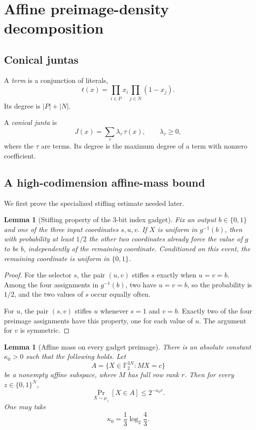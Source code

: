 \documentclass[11pt]{article}
\newtheorem{lemma}[theorem]{Lemma}
\theoremstyle{definition}
\newcommand{\F}{\mathbb F}
\newcommand{\bits}{\{0,1\}}
\newcommand{\Prb}{\mathop{\Pr}}
\begin{document}
\section{Affine preimage-density decomposition}\label{sec:indexing-lift}

\subsection{Conical juntas}

A \emph{term} is a conjunction of literals,
\[
 t(x)=\prod_{i\in P}x_i\prod_{j\in N}(1-x_j).
\]
Its degree is $|P|+|N|$.

A \emph{conical junta} is
\[
  J(x)=\sum_\tau \lambda_\tau\,\tau(x),
  \qquad \lambda_\tau\ge 0,
\]
where the $\tau$ are terms.  Its degree is the maximum degree of a term with nonzero
coefficient.

\subsection{A high-codimension affine-mass bound}

We first prove the specialized stifling estimate needed later.

\begin{lemma}[Stifling property of the $3$-bit index gadget]\label{lem:stifle}
Fix an output $b\in\bits$ and one of the three input coordinates
$s,u,v$.  If $X$ is uniform in $g^{-1}(b)$, then with probability at least $1/2$
the other two coordinates already force the value of $g$ to be $b$, independently
of the remaining coordinate.
Conditioned on this event, the remaining coordinate is uniform in $\bits$.
\end{lemma}

\begin{proof}
For the selector $s$, the pair $(u,v)$ stifles $s$ exactly when $u=v=b$.
Among the four assignments in $g^{-1}(b)$, two have $u=v=b$, so the probability is
$1/2$, and the two values of $s$ occur equally often.

For $u$, the pair $(s,v)$ stifles $u$ whenever $s=1$ and $v=b$.
Exactly two of the four preimage assignments have this property, one for each value of
$u$.  The argument for $v$ is symmetric.
\end{proof}

\begin{lemma}[Affine mass on every gadget preimage]\label{lem:high-rank}
There is an absolute constant $\kappa_0>0$ such that the following holds.
Let
\[
  A=\{X\in\F_2^{3N}:MX=c\}
\]
be a nonempty affine subspace, where $M$ has full row rank $r$.
Then for every $z\in\bits^N$,
\[
  \Prb_{X\sim\mu_z}[X\in A]
  \le
  2^{-\kappa_0 r}.
  \tag{4.1}\label{eq:highrank}
\]
One may take
\[
  \kappa_0=\frac13\log_2\frac43.
\]
\end{lemma}
\end{document}
